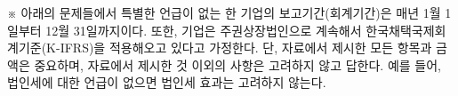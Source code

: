 \begin{framedtext}
※ 아래의 문제들에서 특별한 언급이 없는 한 기업의 보고기간(회계기간)은 매년 1월 1일부터 12월 31일까지이다. 또한, 기업은 주권상장법인으로 계속해서 한국채택국제회계기준(K-IFRS)을 적용해오고 있다고 가정한다. 단, 자료에서 제시한 모든 항목과 금액은 중요하며, 자료에서 제시한 것 이외의 사항은 고려하지 않고 답한다. 예를 들어, 법인세에 대한 언급이 없으면 법인세 효과는 고려하지 않는다. \par
\end{framedtext}
